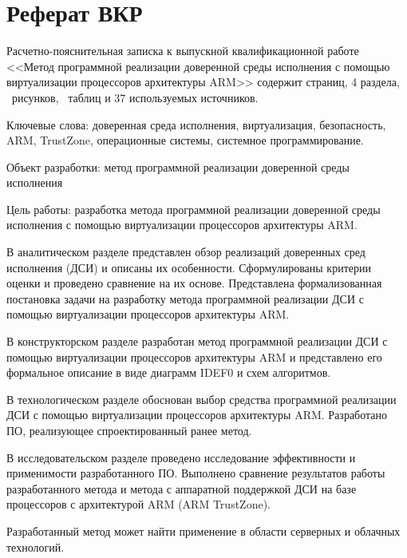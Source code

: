 \section{Реферат ВКР}

Расчетно-пояснительная записка к выпускной квалификационной работе <<Метод программной реализации доверенной среды исполнения с помощью виртуализации процессоров архитектуры ARM>> содержит \pageref{LastPage} страниц, 4 раздела, \totalfigures\ рисунков, \totaltables\ таблиц и 37 используемых источников.

Ключевые слова: доверенная среда исполнения, виртуализация, безопасность, ARM, TrustZone, операционные системы, системное программирование.

Объект разработки: метод программной реализации доверенной среды исполнения

Цель работы: разработка метода программной реализации доверенной среды исполнения с помощью виртуализации процессоров архитектуры ARM.
 
В аналитическом разделе представлен обзор реализаций доверенных сред исполнения (ДСИ) и описаны их особенности. Сформулированы критерии оценки и проведено сравнение на их основе. Представлена формализованная постановка задачи на разработку метода программной реализации ДСИ с помощью виртуализации процессоров архитектуры ARM.

В конструкторском разделе разработан метод программной реализации ДСИ с помощью виртуализации процессоров архитектуры ARM и представлено его формальное описание в виде диаграмм IDEF0 и схем алгоритмов.

В технологическом разделе обоснован выбор средства программной реализации ДСИ с помощью виртуализации процессоров архитектуры ARM. Разработано ПО, реализующее спроектированный ранее метод.

В исследовательском разделе проведено исследование эффективности и применимости разработанного ПО. Выполнено сравнение результатов работы разработанного метода и метода с аппаратной поддержкой ДСИ на базе процессоров с архитектурой ARM (ARM TrustZone).

Разработанный метод может найти применение в области серверных и облачных технологий.

\pagebreak

